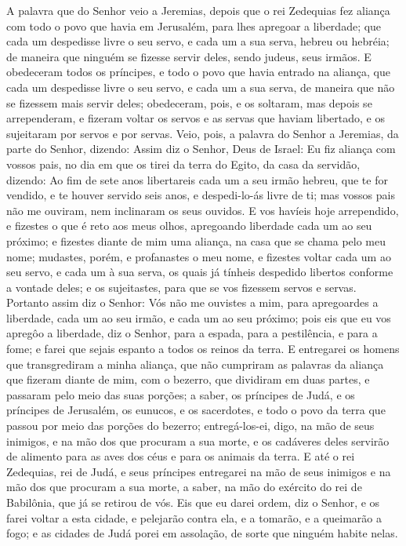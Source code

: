 A palavra que do Senhor veio a Jeremias, depois que o rei
Zedequias fez aliança com todo o povo que havia em Jerusalém, para
lhes apregoar a liberdade; que cada um despedisse livre o seu
servo, e cada um a sua serva, hebreu ou hebréia; de maneira que
ninguém se fizesse servir deles, sendo judeus, seus irmãos. E
obedeceram todos os príncipes, e todo o povo que havia entrado na
aliança, que cada um despedisse livre o seu servo, e cada um a sua
serva, de maneira que não se fizessem mais servir deles; obedeceram,
pois, e os soltaram, mas depois se arrependeram, e fizeram
voltar os servos e as servas que haviam libertado, e os sujeitaram
por servos e por servas. Veio, pois, a palavra do Senhor a
Jeremias, da parte do Senhor, dizendo: Assim diz o Senhor,
Deus de Israel: Eu fiz aliança com vossos pais, no dia em que os
tirei da terra do Egito, da casa da servidão, dizendo: Ao fim
de sete anos libertareis cada um a seu irmão hebreu, que te for
vendido, e te houver servido seis anos, e despedi-lo-ás livre de ti;
mas vossos pais não me ouviram, nem inclinaram os seus ouvidos.
E vos havíeis hoje arrependido, e fizestes o que é reto aos
meus olhos, apregoando liberdade cada um ao seu próximo; e fizestes
diante de mim uma aliança, na casa que se chama pelo meu nome;
mudastes, porém, e profanastes o meu nome, e fizestes voltar
cada um ao seu servo, e cada um à sua serva, os quais já tínheis
despedido libertos conforme a vontade deles; e os sujeitastes, para
que se vos fizessem servos e servas. Portanto assim diz o
Senhor: Vós não me ouvistes a mim, para apregoardes a liberdade,
cada um ao seu irmão, e cada um ao seu próximo; pois eis que eu vos
apregôo a liberdade, diz o Senhor, para a espada, para a
pestilência, e para a fome; e farei que sejais espanto a todos os
reinos da terra. E entregarei os homens que transgrediram a
minha aliança, que não cumpriram as palavras da aliança que fizeram
diante de mim, com o bezerro, que dividiram em duas partes, e
passaram pelo meio das suas porções; a saber, os príncipes de
Judá, e os príncipes de Jerusalém, os eunucos, e os sacerdotes, e
todo o povo da terra que passou por meio das porções do bezerro;
entregá-los-ei, digo, na mão de seus inimigos, e na mão dos
que procuram a sua morte, e os cadáveres deles servirão de alimento
para as aves dos céus e para os animais da terra. E até o rei
Zedequias, rei de Judá, e seus príncipes entregarei na mão de seus
inimigos e na mão dos que procuram a sua morte, a saber, na mão do
exército do rei de Babilônia, que já se retirou de vós. Eis
que eu darei ordem, diz o Senhor, e os farei voltar a esta cidade, e
pelejarão contra ela, e a tomarão, e a queimarão a fogo; e as
cidades de Judá porei em assolação, de sorte que ninguém habite
nelas.

